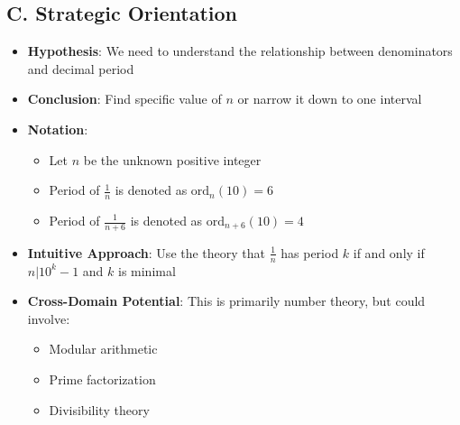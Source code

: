 \documentclass[11pt]{article}
\begin{document}
\begin{problemconfigbox}
\subsection*{C. Strategic Orientation}
\begin{itemize}[leftmargin=*]
    \item \textbf{Hypothesis}: We need to understand the relationship between denominators and decimal period
    \item \textbf{Conclusion}: Find specific value of $n$ or narrow it down to one interval
    \item \textbf{Notation}: 
    \begin{itemize}
        \item Let $n$ be the unknown positive integer
        \item Period of $\frac{1}{n}$ is denoted as $\text{ord}_n(10) = 6$
        \item Period of $\frac{1}{n+6}$ is denoted as $\text{ord}_{n+6}(10) = 4$
    \end{itemize}
    \item \textbf{Intuitive Approach}: Use the theory that $\frac{1}{n}$ has period $k$ if and only if $n | 10^k - 1$ and $k$ is minimal
    \item \textbf{Cross-Domain Potential}: This is primarily number theory, but could involve:
    \begin{itemize}
        \item Modular arithmetic
        \item Prime factorization
        \item Divisibility theory
    \end{itemize}
\end{itemize}
\end{problemconfigbox}
\end{document}
